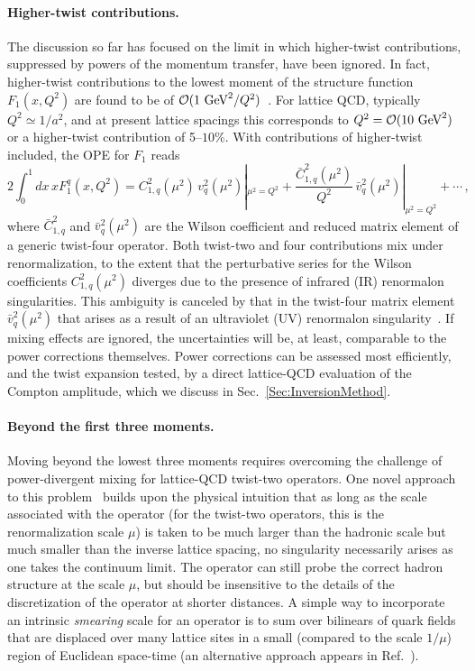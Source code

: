 \paragraph*{Higher-twist contributions.}
%
The discussion so far has focused on the limit in which higher-twist 
contributions, suppressed by powers of the momentum transfer, have been ignored.
%
In fact, higher-twist contributions to the lowest moment of the structure 
function $F_1(x,Q^2)$ are found to be of 
${\cal O}(1\mbox{ GeV}^2/Q^2)$~\cite{Blumlein:2008kz}.
%
For lattice QCD, typically $Q^2 \simeq 1/a^2$, and at present lattice spacings 
this corresponds to $Q^2 = {\cal O}(10\mbox{ GeV}^2)$ or a higher-twist 
contribution of 5--$10\%$. 
%
With contributions of higher-twist included, the OPE for $F_1$ reads
\begin{equation}
2 \int_0^1 dx\, x F_1^q(x,Q^2) = C_{1,q}^2(\mu^2)\, v_q^2(\mu^2)|_{\mu^2=Q^2} + \frac{\bar{C}_{1,q}^2(\mu^2)}{Q^2}\, \bar{v}_q^2(\mu^2)|_{\mu^2=Q^2} + \cdots \,,
\label{tex}
\end{equation}
where $\bar{C}_{1,q}^2$ and $\bar{v}_q^2(\mu^2)$ are the Wilson coefficient and 
reduced matrix element of a generic twist-four operator. 
%
Both twist-two and four contributions mix under renormalization, to the extent 
that the perturbative series for the Wilson coefficients $C_{1,q}^2(\mu^2)$ 
diverges due to the presence of infrared (IR) renormalon singularities.
%
This ambiguity is canceled by that in the twist-four matrix element 
$\bar{v}_q^2(\mu^2)$ that arises as a result of an ultraviolet (UV) 
renormalon singularity~\cite{Martinelli:1996pk}. 
%
If mixing effects are ignored, the uncertainties will be, at least, comparable 
to the power corrections themselves.
%
Power corrections can be assessed most efficiently, and the twist expansion 
tested, by a direct lattice-QCD evaluation of the Compton amplitude, which we 
discuss in Sec.~\ref{Sec:InversionMethod}.

\paragraph*{Beyond the first three moments.}
%
Moving beyond the lowest three moments requires overcoming the challenge of 
power-divergent mixing for lattice-QCD twist-two operators.
%
One novel approach to this problem~\cite{Davoudi:2012ya} builds upon the 
physical intuition that as long as the scale associated with the operator 
(for the twist-two operators, this is the renormalization scale $\mu$) is taken 
to be much larger than the hadronic scale but much smaller than the inverse 
lattice spacing, no singularity necessarily arises as one takes the continuum 
limit.
%
The operator can still probe the correct hadron structure at the scale $\mu$, 
but should be insensitive to the details of the discretization of the operator 
at shorter distances.
%
A simple way to incorporate an intrinsic {\it smearing} scale for an operator 
is to sum over bilinears of quark fields that are displaced over many lattice 
sites in a small (compared to the scale $1/\mu$) region of Euclidean space-time 
(an alternative approach appears in Ref.~\cite{Monahan:2015lha}).

